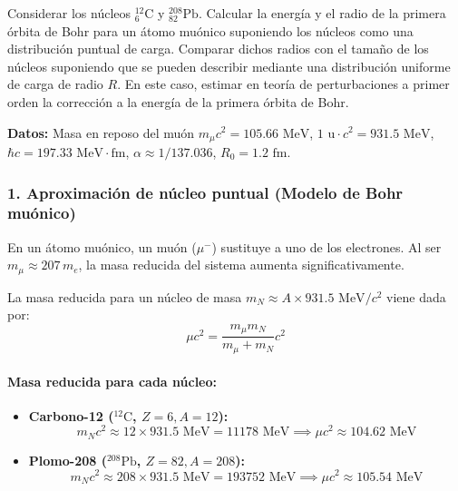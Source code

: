 \newpage
\begin{problema}
Considerar los núcleos ${}_6^{12}\text{C}$ y ${}_{82}^{208}\text{Pb}$. Calcular la energía y el radio de la primera órbita de Bohr para un átomo muónico suponiendo los núcleos como una distribución puntual de carga. Comparar dichos radios con el tamaño de los núcleos suponiendo que se pueden describir mediante una distribución uniforme de carga de radio $R$. En este caso, estimar en teoría de perturbaciones a primer orden la corrección a la energía de la primera órbita de Bohr.

\textbf{Datos:} Masa en reposo del muón $m_\mu c^2 = 105.66\text{ MeV}$, $1\text{ u} \cdot c^2 = 931.5\text{ MeV}$, $\hbar c = 197.33\text{ MeV}\cdot\text{fm}$, $\alpha \approx 1/137.036$, $R_0 = 1.2\text{ fm}$.

\tcblower

\subsubsection*{1. Aproximación de núcleo puntual (Modelo de Bohr muónico)}

En un átomo muónico, un muón ($\mu^-$) sustituye a uno de los electrones. Al ser $m_\mu \approx 207 \, m_e$, la masa reducida del sistema aumenta significativamente.

La masa reducida para un núcleo de masa $m_N \approx A \times 931.5\text{ MeV}/c^2$ viene dada por:
\begin{equation*}
\mu c^2 = \frac{m_\mu m_N}{m_\mu + m_N} c^2
\end{equation*}

\paragraph{Masa reducida para cada núcleo:}
\begin{itemize}
    \item \textbf{Carbono-12 (${}^{12}\text{C}$, $Z = 6, A = 12$):}
    \begin{equation*}
    m_N c^2 \approx 12 \times 931.5\text{ MeV} = 11178\text{ MeV} \implies \mu c^2 \approx 104.62\text{ MeV}
    \end{equation*}
    
    \item \textbf{Plomo-208 (${}^{208}\text{Pb}$, $Z = 82, A = 208$):}
    \begin{equation*}
    m_N c^2 \approx 208 \times 931.5\text{ MeV} = 193752\text{ MeV} \implies \mu c^2 \approx 105.54\text{ MeV}
    \end{equation*}
\end{itemize}


\end{problema}
